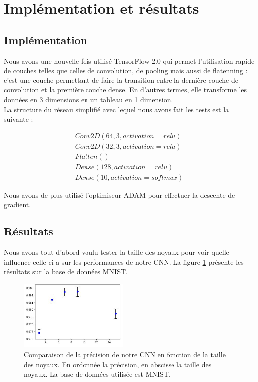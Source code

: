 \section{Implémentation et résultats}

\subsection{Implémentation}

Nous avons une nouvelle fois utilisé TensorFlow 2.0 qui permet l'utilisation rapide de couches telles que celles de convolution, de pooling mais aussi de flatenning : c'est une couche permettant de faire la transition entre la dernière couche de convolution et la première couche dense. En d'autres termes, elle transforme les données en 3 dimensions en un tableau en 1 dimension.\\
La structure du réseau simplifié avec lequel nous avons fait les tests est la suivante :

\[ \begin{array}{lcr}
	Conv2D(64, 3, activation=relu) \\
    Conv2D(32, 3, activation=relu) \\
    Flatten() \\
    Dense(128, activation=relu) \\
    Dense(10, activation=softmax)\end{array}\]

Nous avons de plus utilisé l'optimiseur ADAM pour effectuer la descente de gradient.

\subsection{Résultats}

Nous avons tout d'abord voulu tester la taille des noyaux pour voir quelle influence celle-ci a sur les performances de notre CNN. La figure \ref{resultat_noyaux} présente les résultats sur la base de données MNIST.

\begin{figure}[!h]
\centering
\includegraphics[width=150pt]{images/cnn/resultat_noyau.png}
\caption{Comparaison de la précision de notre CNN en fonction de la taille des noyaux. En ordonnée la précision, en abscisse la taille des noyaux. La base de données utilisée est MNIST.}
\label{resultat_noyaux}
\end{figure}

